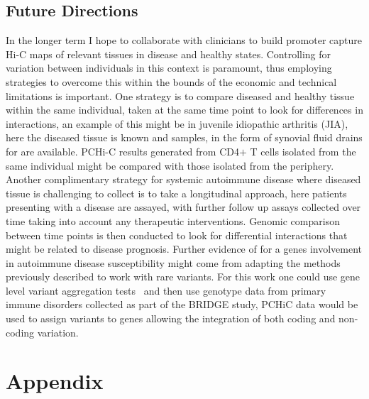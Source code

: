 \documentclass[a4paper,11pt]{report}
\begin{document}
\section{Future Directions}
In the longer term I hope to collaborate with clinicians to build promoter capture Hi-C maps of relevant tissues in disease and healthy states. Controlling for variation between individuals in this context is paramount, thus employing strategies to overcome this within the bounds of the economic and technical limitations is important. One strategy is to compare diseased and healthy tissue within the same individual, taken at the same time point to  look for differences in interactions, an example of this might be in juvenile idiopathic arthritis (JIA), here the diseased tissue is known and samples, in the form of synovial fluid drains for are available. PCHi-C results generated from CD4$+$ T cells isolated from the same individual might be compared with those isolated from the periphery. Another complimentary strategy for systemic autoimmune disease where diseased tissue is challenging to collect is to take a longitudinal approach, here patients presenting with a disease are assayed, with further follow up assays collected over time taking into account any therapeutic interventions. Genomic comparison between time points is then conducted to look for differential interactions that might be related to disease prognosis. Further evidence of for a genes involvement in autoimmune disease susceptibility might come from adapting the methods previously described to work with rare variants. For this work one could use gene level variant aggregation tests~\citep{LeeTeslovichBoehnkeEtAl2013} and then use genotype data from primary immune disorders collected as part of the BRIDGE study, PCHiC data would be used to assign variants to genes allowing the integration of both coding and non-coding variation.

\chapter{Appendix}

	
	\begin{landscape}
	 	
	\end{landscape}

%

\end{document}
